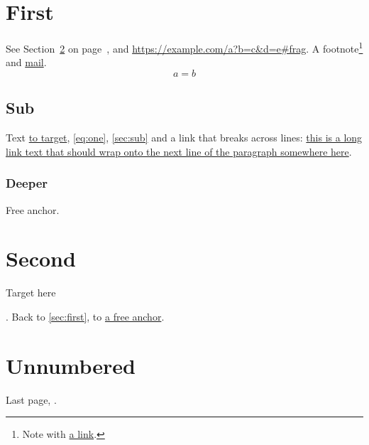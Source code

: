 \documentclass{article}
\begin{document}
\tableofcontents
\section{First}\label{sec:first}
See Section~\ref{sec:second} on page~\pageref{sec:second}, and \url{https://example.com/a?b=c&d=e#frag}.
A footnote\footnote{Note with \href{https://example.org/~user/x\%20y}{a link}.} and \href{mailto:a@b.c}{mail}.
\begin{equation}\label{eq:one} a = b \end{equation}
\subsection{Sub}\label{sec:sub}
Text \hyperlink{tgt}{to target}, \autoref{eq:one}, \autoref{sec:sub} and a link that
breaks across lines: \href{https://example.com/a/very/long/path/that/keeps/going/and/going}{this
is a long link text that should wrap onto the next line of the paragraph somewhere here}.
\subsubsection{Deeper}
\label{anchor:free}Free anchor.
\newpage
\section{Second}\label{sec:second}
\hypertarget{tgt}{Target here}. Back to \autoref{sec:first}, to \hyperref[anchor:free]{a free anchor}.
\newpage
\section*{Unnumbered}
Last page, .
\end{document}
